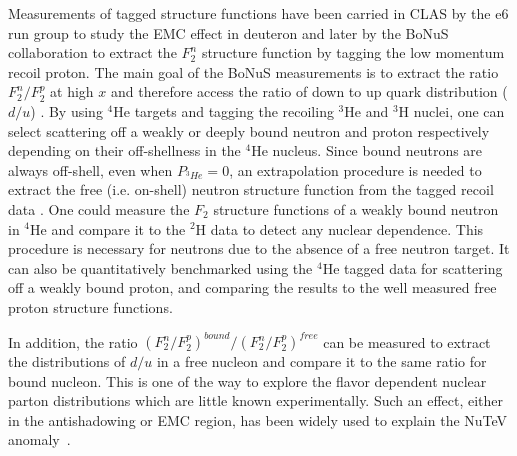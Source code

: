 Measurements of tagged structure functions have been carried in CLAS by the e6 run group to study the EMC effect in deuteron \cite{klimenko2006} and later by the BoNuS collaboration \cite{bonus6} to extract the $F^n_2$ structure function by tagging the low momentum recoil proton. The main goal of the BoNuS measurements is to extract the ratio $F^n_2/F^p_2$ at high $x$ and therefore access the ratio of down to up quark distribution ($d/u$) \cite{Baillie:2011za}. By using $^4$He targets and tagging the recoiling $^3$He and $^3$H nuclei, one can select scattering off a weakly or deeply bound neutron and proton respectively depending on their off-shellness in the $^4$He nucleus. Since bound neutrons are always off-shell, even when $P_{^3He}=0$, an extrapolation procedure is needed to extract the free (i.e. on-shell) neutron structure function from the tagged recoil data \cite{Sargsian:2005rm}. One could measure the $F_2$ structure functions of a weakly bound neutron in $^4$He and compare it to the $^2$H data to detect any nuclear dependence. This procedure is necessary for neutrons due to the absence of a free neutron target. It can also be quantitatively benchmarked using the $^4$He tagged data for scattering off a weakly bound proton, and comparing the results to the well measured free proton structure functions.

In addition, the ratio $\left(F_2^n/F_2^p \right)^{bound}/ \left(F_2^n/F_2^p \right)^{free}$ can be measured to extract the distributions of $d/u$ in a free nucleon and compare it to the same ratio for bound nucleon. This is one of the way to explore the flavor dependent nuclear parton distributions which are little known experimentally. Such an effect, either in the antishadowing or EMC region, has been widely used to explain the NuTeV anomaly~\cite{Brodsky:2004qa,Cloet2009}. %


